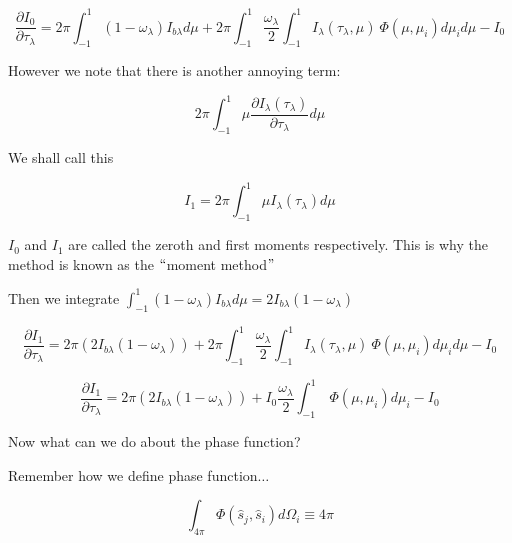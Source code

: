 \documentclass[12pt]{article}
\renewcommand{\_}{\kern-1.5pt\textunderscore\kern-1.5pt}
\begin{document}
\begin{itemize}
 \[ \frac{ \partial I_{0}}{ \partial  \tau_{ \lambda }}=2 \pi  \int _{-1}^{1} \left( 1- \omega _{ \lambda } \right) I_{b \lambda } d \mu +2 \pi  \int _{-1}^{1}\frac{ \omega _{ \lambda }}{2} \int _{-1}^{1}I_{ \lambda } \left(  \tau_{ \lambda }, \mu  \right) ~ \Phi  \left(  \mu , \mu _{i} \right) d \mu _{i}d \mu -I_{0} \] \par

However we note that there is another annoying term: \par

 \[ 2 \pi  \int _{-1}^{1} \mu \frac{ \partial I_{ \lambda } \left(  \tau_{ \lambda } \right) }{ \partial  \tau_{ \lambda }}d \mu  \] \par

We shall call this\par

 \[ I_{1}=2 \pi  \int _{-1}^{1} \mu I_{ \lambda } \left(  \tau_{ \lambda } \right) d \mu  \] \par

 \( I_{0} \)  and  \( I_{1} \)  are called the zeroth and first moments respectively. This is why the method is known as the $``$moment method$"$ \par

Then we integrate  \(  \int _{-1}^{1} \left( 1- \omega _{ \lambda } \right) I_{b \lambda } d \mu =2I_{b \lambda } \left( 1- \omega _{ \lambda } \right)  \) \par

 \[ \frac{ \partial I_{1}}{ \partial  \tau_{ \lambda }}=2 \pi  \left( 2I_{b \lambda } \left( 1- \omega _{ \lambda } \right)  \right) +2 \pi  \int _{-1}^{1}\frac{ \omega _{ \lambda }}{2} \int _{-1}^{1}I_{ \lambda } \left(  \tau_{ \lambda }, \mu  \right) ~ \Phi  \left(  \mu , \mu _{i} \right) d \mu _{i}d \mu -I_{0} \] \par

 \[ \frac{ \partial I_{1}}{ \partial  \tau_{ \lambda }}=2 \pi  \left( 2I_{b \lambda } \left( 1- \omega _{ \lambda } \right)  \right) +I_{0}\frac{ \omega _{ \lambda }}{2} \int _{-1}^{1}~ \Phi  \left(  \mu , \mu _{i} \right) d \mu _{i}-I_{0} \] \par


\vspace{\baselineskip}
Now what can we do about the phase function?\par

Remember how we define phase function$ \ldots $ \par

 \[  \int _{4 \pi }^{} \Phi  \left( \hat{s}_{j},\hat{s}_{i} \right) d \Omega _{i} \equiv 4 \pi  \] \par


\end{itemize}
\end{document}
